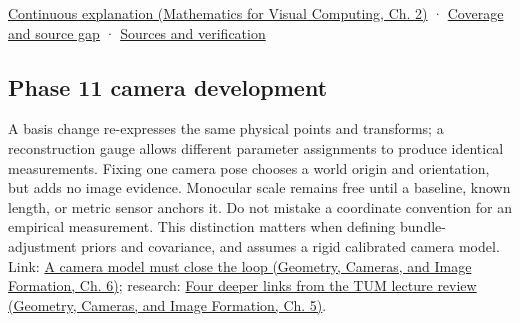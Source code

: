 \hypertarget{appendix-1bae9457dbc3-source-and-navigation}{}

\href{../02-Mathematics-for-Visual-Computing/main.pdf\#nameddest=01-foundations-i-ch018-keep-the-promises-visible-while-moving-between-representations}{Continuous explanation (Mathematics for Visual Computing, Ch. 2)} · \hyperref[appendix-fd090d982a15-phase-7---parts-601-700]{Coverage and source gap} · \hyperref[appendix-a103e7846d21-phase-7---source-analysis-and-verification]{Sources and verification}

\subsection{Phase 11 camera development}\label{appendix-1bae9457dbc3-phase-11-camera-development}

\hypertarget{appendix-1bae9457dbc3-phase-11-camera-development}{}

A basis change re-expresses the same physical points and transforms; a reconstruction gauge allows different parameter assignments to produce identical measurements. Fixing one camera pose chooses a world origin and orientation, but adds no image evidence. Monocular scale remains free until a baseline, known length, or metric sensor anchors it. Do not mistake a coordinate convention for an empirical measurement. This distinction matters when defining bundle-adjustment priors and covariance, and assumes a rigid calibrated camera model. Link: \href{../03-Geometry-Cameras-and-Image-Formation/main.pdf\#nameddest=02-foundations-ii-ch037-a-camera-model-must-close-the-loop}{A camera model must close the loop (Geometry, Cameras, and Image Formation, Ch. 6)}; research: \href{../03-Geometry-Cameras-and-Image-Formation/main.pdf\#nameddest=02-foundations-ii-ch036-four-deeper-links-from-the-tum-lecture-review}{Four deeper links from the TUM lecture review (Geometry, Cameras, and Image Formation, Ch. 5)}.
